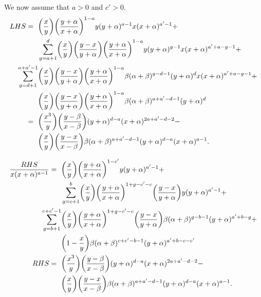 \documentclass[ALCO, Unicode]{cedram}
\DeclarePairedDelimiter\autobracket{(}{)}
\newcommand{\br}[1]{\autobracket*{#1}}
\begin{document}
We now assume that $a>0$ and $c'>0$.
{\allowdisplaybreaks
\begin{align*}
LHS=\text{ }& \br{\dfrac{x}{y}}\br{\dfrac{y+\alpha}{x+\alpha}}^{1-a} y (y+\alpha)^{a-1} x (x+\alpha)^{a'-1}+\\
            & \sum^{d}_{g=a+1} \br{\dfrac{x}{y}}\br{\dfrac{y-x}{y+\alpha}}\br{\dfrac{y+\alpha}{x+\alpha}}^{1-a} y(y+\alpha)^{g-1} x (x+\alpha)^{a'+a-g-1}+\\
             \sum^{a+a'-1}_{g=d+1} &\br{\dfrac{x}{y}}\br{\dfrac{y-x}{y+\alpha}}\br{\dfrac{y+\alpha}{x+\alpha}}^{1-a} \beta(\alpha+\beta)^{g-d-1}(y+\alpha)^d x (x+\alpha)^{a'+a-g-1}+\\
            &\br{\dfrac{x}{y}}\br{\dfrac{y-x}{y+\alpha}}\br{\dfrac{y+\alpha}{x+\alpha}}^{1-a} \beta(\alpha+\beta)^{a+a'-d-1}(y+\alpha)^d\\
            =\text{ }& \br{\dfrac{x^3}{y}}\br{\dfrac{y-\beta}{x-\beta}}(y+\alpha)^{d-a}(x+\alpha)^{2a+a'-d-2}-\\
            & \br{\dfrac{x}{y}} \br{\dfrac{y-x}{x-\beta}}\beta (\alpha+\beta)^{a+a'-d-1}(y+\alpha)^{d-a}(x+\alpha)^{a-1}.
\end{align*}            
}

{\allowdisplaybreaks
\begin{align*}
\dfrac{RHS}{x(x+\alpha)^{a-1}}
           =\text{ }& \br{\dfrac{x}{y}}\br{\dfrac{y+\alpha}{x+\alpha}}^{1-c'}y (y+\alpha)^{a'-1}+\\
           &\sum^{b}_{g=c+1} \br{\dfrac{x}{y}}\br{\dfrac{y+\alpha}{x+\alpha}}^{1+g-c'-c} \br{\dfrac{y-x}{y+\alpha}}y (y+\alpha)^{a'-1}+\\
           \sum^{c+c'-1}_{g=b+1}& \br{\dfrac{x}{y}}\br{\dfrac{y+\alpha}{x+\alpha}}^{1+g-c'-c} \br{\dfrac{y-x}{y+\alpha}}\beta (\alpha+\beta)^{g-b-1} (y+\alpha)^{a'+b-g}+\\
           &\br{1-\dfrac{x}{y}}\beta (\alpha+\beta)^{c+c'-b-1} (y+\alpha)^{a'+b-c-c'}\\
    RHS   =\text{ }& \br{\dfrac{x^3}{y}}\br{\dfrac{y-\beta}{x-\beta}}(y+\alpha)^{d-a}(x+\alpha)^{2a+a'-d-2}-\\
          & \br{\dfrac{x}{y}}\br{\dfrac{y-x}{x-\beta}}\beta(\alpha+\beta)^{a+a'-d-1}(y+\alpha)^{d-a}(x+\alpha)^{a-1}.
\end{align*}
}
\end{document}
